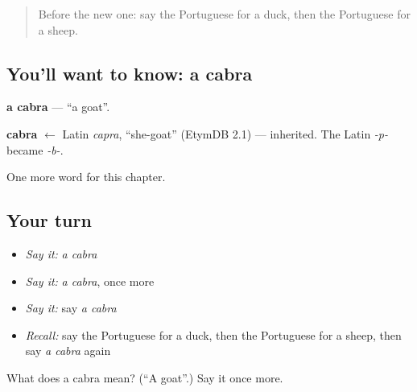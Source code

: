 \label{lesson:PT-C62-cabra}



\begin{quote}
Before the new one: say the Portuguese for a duck, then the Portuguese for a sheep.
\end{quote}

\subsection*{You'll want to know: a cabra}
\textbf{a cabra} — \textquotedblleft{}a goat\textquotedblright{}.

\begin{cousinweb}
\textbf{cabra} $\leftarrow$ Latin \emph{capra}, \textquotedblleft{}she-goat\textquotedblright{} (EtymDB 2.1) — inherited. The Latin \emph{-p-} became \emph{-b-}.
\end{cousinweb}

\begin{grammarlens}[title={What you've built}]
One more word for this chapter.
\end{grammarlens}

\subsection*{Your turn}
\begin{itemize}
\raggedright
  \item \emph{Say it:} \emph{a cabra}
  \item \emph{Say it:} \emph{a cabra}, once more
  \item \emph{Say it:} say \emph{a cabra}
  \item \emph{Recall:} say the Portuguese for a duck, then the Portuguese for a sheep, then say \emph{a cabra} again
\end{itemize}

\begin{tcolorbox}[breakable,colback=teal!4,colframe=teal!35!black,title={Before you move on}]
What does a cabra mean? (\textquotedblleft{}A goat\textquotedblright{}.) Say it once more.
\end{tcolorbox}
